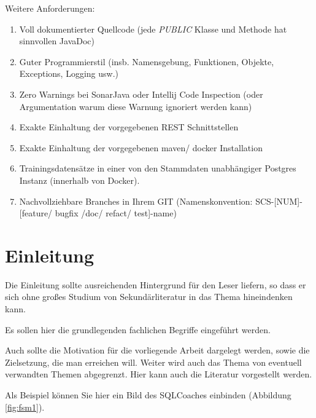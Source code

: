 \documentclass[fleqn,10pt,ngerman]{SelfArx}
\newlength{\tocsep}
\begin{document}
	
	Weitere Anforderungen:
	\begin{enumerate}
		
		\item Voll dokumentierter Quellcode (jede \textit{PUBLIC} Klasse und Methode hat sinnvollen JavaDoc)
		\item Guter Programmierstil (insb. Namensgebung, Funktionen, Objekte, Exceptions, Logging usw.)
		\item Zero Warnings bei SonarJava oder Intellij Code Inspection (oder Argumentation warum diese Warnung ignoriert werden kann)
		\item Exakte Einhaltung der vorgegebenen REST Schnittstellen
		\item Exakte Einhaltung der vorgegebenen maven/ docker Installation
		\item Trainingsdatens\"atze in einer von den Stammdaten unabhängiger Postgres Instanz (innerhalb von Docker). 
		\item Nachvollziehbare Branches in Ihrem GIT (Namenskonvention: SCS-[NUM]-[feature/ bugfix /doc/ refact/ test]-name) 
		
	\end{enumerate}
	
	
	\section{Einleitung} %
	
	
	Die Einleitung sollte ausreichenden Hintergrund für den Leser liefern, so dass er sich ohne großes Studium von Sekundärliteratur in das Thema hineindenken kann. 
	
	Es sollen hier die grundlegenden fachlichen Begriffe eingeführt werden. 
	
	Auch sollte die Motivation für die vorliegende Arbeit dargelegt werden, sowie die Zielsetzung, die man erreichen will. Weiter wird auch das Thema von eventuell verwandten Themen abgegrenzt. Hier kann auch die Literatur \cite{Harel:1987,Harel2006,Gurp99onthe} vorgestellt werden.
	
	Als Beispiel können Sie hier ein Bild des SQLCoaches einbinden (Abbildung \ref{fig:fsm1}).
	
\end{document}
